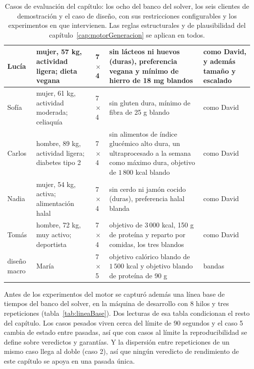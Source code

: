 \begin{table}[htbp]
\begin{tabular}{|p{1.5cm}|p{3cm}|p{1.3cm}|p{4.6cm}|p{3cm}|}
\hline
Lucía & mujer, 57 kg, actividad ligera; dieta vegana & 7 $\times$ 4 & sin lácteos ni huevos (duras), preferencia vegana y mínimo de hierro de 18 mg blandos & como David, y además tamaño y escalado \\
\hline
Sofía & mujer, 61 kg, actividad moderada; celiaquía & 7 $\times$ 4 & sin gluten dura, mínimo de fibra de 25 g blando & como David \\
\hline
Carlos & hombre, 89 kg, actividad ligera; diabetes tipo 2 & 7 $\times$ 4 & sin alimentos de índice glucémico alto dura, un ultraprocesado a la semana como máximo dura, objetivo de $1\,800$ kcal blando & como David \\
\hline
Nadia & mujer, 54 kg, activa; alimentación halal & 7 $\times$ 4 & sin cerdo ni jamón cocido (duras), preferencia halal blanda & como David \\
\hline
Tomás & hombre, 72 kg, muy activo; deportista & 7 $\times$ 4 & objetivo de $3\,000$ kcal, 150 g de proteína y reparto por comidas, los tres blandos & como David \\
\hline
diseño macro & María & 7 $\times$ 5 & objetivo calórico blando de $1\,500$ kcal y objetivo blando de proteína de 90 g & bandas \\
\hline
\end{tabular}
\caption{Casos de evaluación del capítulo: los ocho del banco del solver, los seis clientes de demostración y el caso de diseño, con sus restricciones configurables y los experimentos en que intervienen. Las reglas estructurales y de plausibilidad del capítulo~\ref{cap:motorGeneracion} se aplican en todos.}
\label{tab:casosEvaluacion}
\end{table}

Antes de los experimentos del motor se capturó además una línea base de tiempos del banco del solver, en la máquina de desarrollo con 8 hilos y tres repeticiones (tabla~\ref{tab:lineaBase}). Dos lecturas de esa tabla condicionan el resto del capítulo. Los casos pesados viven cerca del límite de 90 segundos y el caso 5 cambia de estado entre pasadas, así que con casos al límite la reproducibilidad se define sobre veredictos y garantías. Y la dispersión entre repeticiones de un mismo caso llega al doble (caso 2), así que ningún veredicto de rendimiento de este capítulo se apoya en una pasada única.

